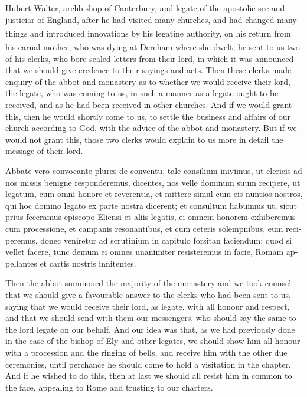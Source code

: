 \documentclass{book}
\newcounter{engnote}
\newcommand{\engnotenum}{\textsuperscript{\arabic{engnote}\stepcounter{engnote}}}
\begin{document}
\begin{paracol}{2}
Hubert Walter, archbishop of Canterbury, and legate of the apostolic see and justiciar of England, after he had visited many churches, and had changed many things and introduced innovations by his legatine authority,\engnotenum{} on his return from his carnal mother, who was dying at Dereham\engnotenum{} where she dwelt, he sent to us two of his clerks, who bore sealed letters from their lord, in which it was announced that we should give credence to their sayings and acts. Then these clerks made enquiry of the abbot and monastery as to whether we would receive their lord, the legate, who was coming to us, in such a manner as a legate ought to be received, and as he had been received in other churches. And if we would grant this, then he would shortly come to us, to settle the business and affairs of our church according to God, with the advice of the abbot and monastery. But if we would not grant this, those two clerks would explain to us more in detail the message of their lord.

\switchcolumn*

\begin{otherlanguage}{latin}
Abbate vero convocante plures de conventu, tale consilium inivimus, ut clericis ad nos missis benigne responderemus, dicentes, nos velle dominum suum recipere, ut legatum, cum omni honore et reverentia, et mittere simul cum eis nuntios nostros, qui hoc domino legato ex parte nostra dicerent; et consultum habuimus ut, sicut prius feceramus episcopo Eliensi et aliis legatis, ei omnem honorem exhiberemus cum processione, et campanis resonantibus, et cum ceteris solempnibus, eum reciperemus, donec veniretur ad scrutinium in capitulo forsitan faciendum: quod si vellet facere, tunc demum ei omnes unanimiter resisteremus in facie, Romam appellantes et cartis nostris innitentes. 

\end{otherlanguage}

\switchcolumn

Then the abbot summoned the majority of the monastery and we took counsel that we should give a favourable answer to the clerks who had been sent to us, saying that we would receive their lord, as legate, with all honour and respect, and that we should send with them our messengers, who should say the same to the lord legate on our behalf. And our idea was that, as we had previously done in the case of the bishop of Ely and other legates, we should show him all honour with a procession and the ringing of bells, and receive him with the other due ceremonies, until perchance he should come to hold a visitation in the chapter. And if he wished to do this, then at last we should all resist him in common to the face, appealing to Rome and trusting to our charters.


\end{paracol}
\end{document}
